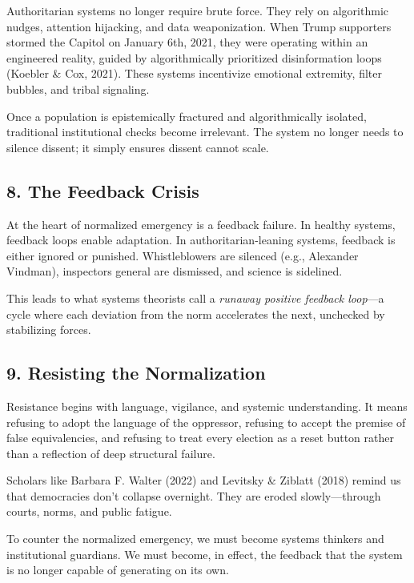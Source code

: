 \documentclass[
]{article}
\begin{document}
Authoritarian systems no longer require brute force. They rely on algorithmic nudges, attention hijacking, and data weaponization. When Trump supporters stormed the Capitol on January 6th, 2021, they were operating within an engineered reality, guided by algorithmically prioritized disinformation loops (Koebler \& Cox, 2021). These systems incentivize emotional extremity, filter bubbles, and tribal signaling.

Once a population is epistemically fractured and algorithmically isolated, traditional institutional checks become irrelevant. The system no longer needs to silence dissent; it simply ensures dissent cannot scale.

\subsection{8. The Feedback Crisis}\label{the-feedback-crisis}

At the heart of normalized emergency is a feedback failure. In healthy systems, feedback loops enable adaptation. In authoritarian-leaning systems, feedback is either ignored or punished. Whistleblowers are silenced (e.g., Alexander Vindman), inspectors general are dismissed, and science is sidelined.

This leads to what systems theorists call a \emph{runaway positive feedback loop}---a cycle where each deviation from the norm accelerates the next, unchecked by stabilizing forces.

\subsection{9. Resisting the Normalization}\label{resisting-the-normalization}

Resistance begins with language, vigilance, and systemic understanding. It means refusing to adopt the language of the oppressor, refusing to accept the premise of false equivalencies, and refusing to treat every election as a reset button rather than a reflection of deep structural failure.

Scholars like Barbara F. Walter (2022) and Levitsky \& Ziblatt (2018) remind us that democracies don't collapse overnight. They are eroded slowly---through courts, norms, and public fatigue.

To counter the normalized emergency, we must become systems thinkers and institutional guardians. We must become, in effect, the feedback that the system is no longer capable of generating on its own.
\end{document}

